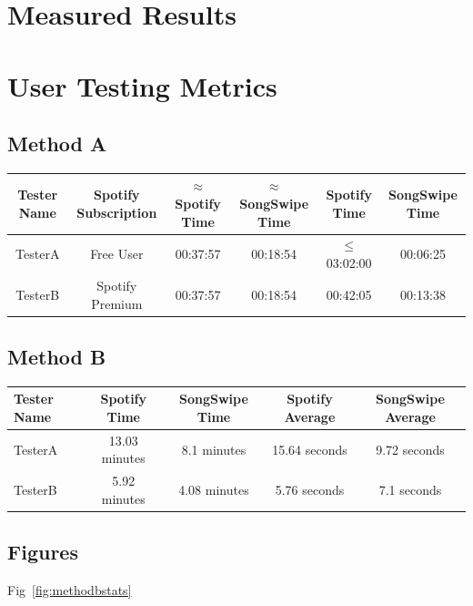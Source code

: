 \documentclass{article}
\begin{document}
\section{Measured Results}
\section*{User Testing Metrics}
\subsection*{Method A}
\hspace{-0.5in}
\begin{tabular}{cccccc}
  \hline
  \small\textbf{Tester Name} & \small\textbf{Spotify Subscription} & \small\textbf{$\approx$ Spotify Time} & \small\textbf{$\approx$ SongSwipe Time} & \small\textbf{Spotify Time} & \small\textbf{SongSwipe Time} \\
  \hline
  TesterA & Free User & 00:37:57 & 00:18:54 & $\leq$ 03:02:00 & 00:06:25 \\
  TesterB & Spotify Premium & 00:37:57 & 00:18:54 & 00:42:05 & 00:13:38 \\
  \hline
\end{tabular}

\subsection*{Method B}
\begin{tabularx}{\textwidth}{X c c c c}
\toprule
\textbf{Tester Name} & \textbf{Spotify Time} & \textbf{SongSwipe Time} & \textbf{Spotify Average} & \textbf{SongSwipe Average} \\
\midrule
TesterA & 13.03 minutes & 8.1 minutes & 15.64 seconds & 9.72 seconds \\
TesterB & 5.92 minutes & 4.08 minutes & 5.76 seconds & 7.1 seconds \\
\bottomrule
\end{tabularx}

\subsection*{Figures}

Fig~\ref{fig:methodbstats}
\end{document}
